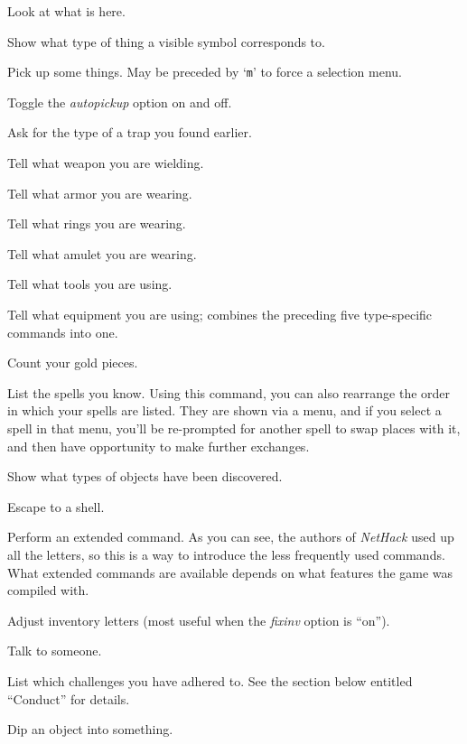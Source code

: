 \item[\tb{:}]
Look at what is here.
\item[\tb{;}]
Show what type of thing a visible symbol corresponds to.
\item[\tb{,}]
Pick up some things. May be preceded by `{\tt m}' to force a selection menu.
\item[\tb{@}]
Toggle the {\it autopickup\/} option on and off.
\item[\tb{\^{}}]
Ask for the type of a trap you found earlier.
\item[\tb{)}]
Tell what weapon you are wielding.
\item[\tb{[}]
Tell what armor you are wearing.
\item[\tb{=}]
Tell what rings you are wearing.
\item[\tb{"}]
Tell what amulet you are wearing.
\item[\tb{(}]
Tell what tools you are using.
\item[\tb{*}]
Tell what equipment you are using; combines the preceding five type-specific
commands into one.
\item[\tb{\$}]
Count your gold pieces.
\item[\tb{+}]
List the spells you know.  Using this command, you can also rearrange
the order in which your spells are listed.  They are shown via a menu,
and if you select a spell in that menu, you'll be re-prompted for
another spell to swap places with it, and then have opportunity to
make further exchanges.
\item[\tb{$\backslash$}]
Show what types of objects have been discovered.
\item[\tb{!}]
Escape to a shell.
\item[\tb{\#}]
Perform an extended command.  As you can see, the authors of {\it NetHack\/}
used up all the letters, so this is a way to introduce the less frequently
used commands.
What extended commands are available depends on what features
the game was compiled with.
\item[\tb{\#adjust}]
Adjust inventory letters (most useful when the
{\it fixinv\/}
option is ``on'').
\item[\tb{\#chat}]
Talk to someone.
\item[\tb{\#conduct}]
List which challenges you have adhered to.  See the section below entitled
``Conduct'' for details.
\item[\tb{\#dip}]
Dip an object into something.
